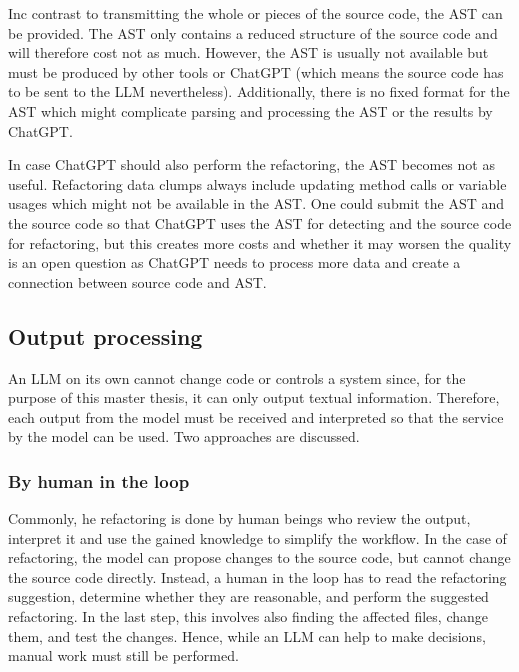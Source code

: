 Inc contrast to transmitting the whole or pieces of the source code, the \ac{AST} can be provided. The \ac{AST} only contains a reduced structure of the source code and will therefore cost not as much. However, the \ac{AST} is usually not available but must be produced by other tools or ChatGPT (which means the source code has to be sent to the \ac{LLM} nevertheless). Additionally, there is no fixed format for the \ac{AST} which might complicate parsing and processing the \ac{AST} or the results by ChatGPT.


In case ChatGPT should also perform the refactoring, the \ac{AST} becomes not as useful. Refactoring data clumps always include updating method calls or variable usages which might not be available in the \ac{AST}. One could submit the \ac{AST} and the source code so that ChatGPT uses the \ac{AST} for detecting and the source code for refactoring, but this creates more costs and whether it may worsen the quality is an open question as ChatGPT needs to process more data and create a connection between source code and \ac{AST}.


\subsection{Output processing}
An \ac{LLM} on its own cannot change code or controls a system since, for the purpose of this master thesis, it  can only output textual information. Therefore, each output from the model must be received and interpreted so that the service by the model can be used. Two approaches are discussed. 

\subsubsection{By human in the loop}
Commonly, he refactoring is done by human beings who review the output, interpret it and use the gained knowledge to simplify the workflow. In the case of refactoring, the model can propose changes to the source code, but cannot change the source code directly. Instead, a human in the loop has to read the refactoring suggestion, determine whether they are reasonable, and perform the suggested refactoring. In the last step, this involves also finding the affected files, change them, and test the changes. Hence, while an \ac{LLM} can help to make decisions, manual work must still be performed. 

